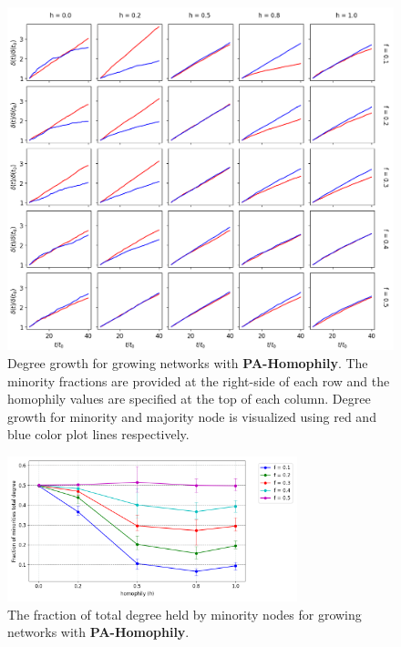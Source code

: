 \begin{figure}[h!]
	\centering
	\includegraphics[width=1.0\textwidth]{images/dg_growth_pa.png}
	\caption{Degree growth for growing networks with \textbf{PA-Homophily}. The minority fractions are provided at the right-side of each row and the homophily values are specified at the top of each column. Degree growth for minority and majority node is visualized using red and blue color plot lines respectively.}
	\label{dg_growth_pa_fig}
\end{figure}

\begin{figure}
	\centering
	\includegraphics[trim=0 5 0 10, clip, width=0.75\textwidth]{images/mf_growth_pa.png}
	\caption{The fraction of total degree held by minority nodes for growing networks with \textbf{PA-Homophily}.}
	\label{mf_growth_pa_fig}
\end{figure}

